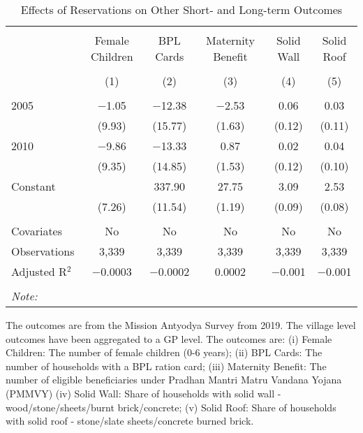 \begin{table}[!htbp]
\centering
\begin{threeparttable}

  \caption{Effects of Reservations on Other Short- and Long-term Outcomes} 
  \label{raj_shrug_other_05_10} 
\scriptsize 
\begin{tabular}{@{\extracolsep{0pt}}lccccc} 
\\[-1.8ex]\hline 
\hline \\[-1.8ex] 
 & Female Children & BPL Cards & Maternity Benefit & Solid Wall & Solid Roof \\ 
\\[-1.8ex] & (1) & (2) & (3) & (4) & (5)\\ 
\hline \\[-1.8ex] 
 2005 & $-$1.05 & $-$12.38 & $-$2.53 & 0.06 & 0.03 \\ 
  & (9.93) & (15.77) & (1.63) & (0.12) & (0.11) \\ 
  2010 & $-$9.86 & $-$13.33 & 0.87 & 0.02 & 0.04 \\ 
  & (9.35) & (14.85) & (1.53) & (0.12) & (0.10) \\ 
  Constant &  & 337.90 & 27.75 & 3.09 & 2.53 \\ 
  & (7.26) & (11.54) & (1.19) & (0.09) & (0.08) \\ 
 \hline \\[-1.8ex] 
Covariates & No & No & No & No & No \\ 
Observations & 3,339 & 3,339 & 3,339 & 3,339 & 3,339 \\ 
Adjusted R$^{2}$ & $-$0.0003 & $-$0.0002 & 0.0002 & $-$0.001 & $-$0.001 \\ 
\hline 
\hline \\[-1.8ex] 
\textit{Note:}  & \multicolumn{5}{l}{} \\ 
\end{tabular} 
\begin{tablenotes}[flushleft]
\scriptsize
\item The outcomes are from the Mission Antyodya Survey from 2019. 
                   The village level outcomes have been aggregated to a GP level. The outcomes are: 
                     (i) Female Children: The number of female children (0-6 years);
                     (ii) BPL Cards: The number of households with a BPL ration card;
                     (iii) Maternity Benefit: The number of eligible beneficiaries under Pradhan Mantri Matru Vandana Yojana (PMMVY)
                     (iv) Solid Wall: Share of households with solid wall - wood/stone/sheets/burnt brick/concrete;
                     (v) Solid Roof: Share of households with solid roof - stone/slate sheets/concrete burned brick.
\end{tablenotes}
\end{threeparttable}
\end{table}
